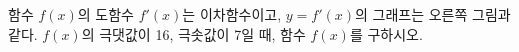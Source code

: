 \noindent\begin{minipage}[t]{0.58\linewidth}\vspace{0pt}\raggedright 함수 $f(x)$의 도함수 $f'(x)$는 이차함수이고, $y=f'(x)$의 그래프는 오른쪽 그림과 같다. $f(x)$의 극댓값이 16, 극솟값이 7일 때, 함수 $f(x)$를 구하시오.\end{minipage}\hfill\begin{minipage}[t]{0.4\linewidth}\vspace{0pt}\centering \resizebox{\ifdim\width>\linewidth\linewidth\else\width\fi}{!}{}\end{minipage}\par
